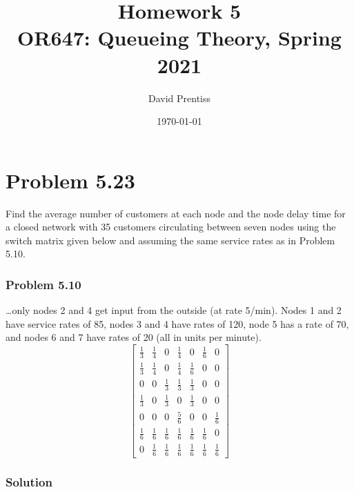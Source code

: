 \documentclass[letterpaper]{amsart}
\title[Homework 2]{Homework 5 \\ OR647: Queueing Theory, Spring 2021}
\author{David Prentiss}
\date{\today}
\begin{document}
\maketitle

\section{Problem 5.23} %
Find the average number of customers at each node and the node delay time for a closed network with 35 customers circulating between seven nodes using the switch matrix given below and assuming the same service rates as in Problem 5.10.
\subsubsection*{Problem 5.10}
\dots only nodes 2 and 4 get input from the outside (at rate 5/min). Nodes 1 and 2 have
service rates of 85, nodes 3 and 4 have rates of 120, node 5 has a rate of 70,
and nodes 6 and 7 have rates of 20 (all in units per minute).
\begin{equation*}
  \begin{bmatrix}
    \frac{1}{3} & \frac{1}{4} & 0 & \frac{1}{4} & 0 & \frac{1}{6} & 0 \\[0.5ex]
    \frac{1}{3} & \frac{1}{4} & 0 & \frac{1}{4} & \frac{1}{6} & 0 & 0 \\[0.5ex]
    0 & 0 & \frac{1}{3} & \frac{1}{3} & \frac{1}{3} & 0 & 0 \\[0.5ex]
    \frac{1}{3} & 0 & \frac{1}{3} & 0 & \frac{1}{3} & 0 & 0 \\[0.5ex]
    0 & 0 & 0 & \frac{5}{6} & 0 & 0 & \frac{1}{6} \\[0.5ex]
    \frac{1}{6} & \frac{1}{6} & \frac{1}{6} & \frac{1}{6} & \frac{1}{6} & \frac{1}{6} & 0 \\[0.5ex]
    0 & \frac{1}{6} & \frac{1}{6} & \frac{1}{6} & \frac{1}{6} & \frac{1}{6} & \frac{1}{6}
  \end{bmatrix}
\end{equation*}
\subsubsection*{Solution}
\end{document}
